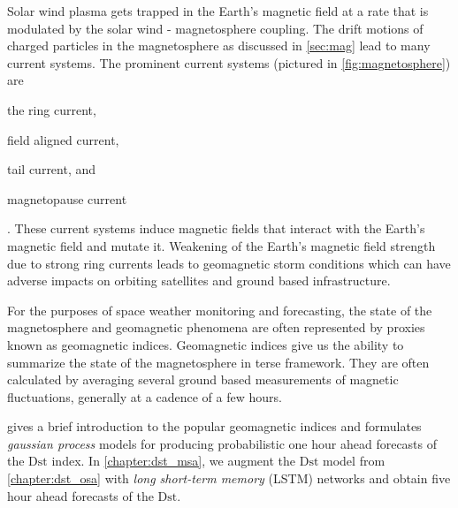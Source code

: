 Solar wind plasma gets trapped in the Earth's magnetic field at a rate that is modulated by the 
solar wind - magnetosphere coupling. The drift motions of charged particles in the magnetosphere as 
discussed in \cref{sec:mag} lead to many current systems. The prominent current systems 
(pictured in \cref{fig:magnetosphere}) are 
%
\begin{enumerate*} 
    \item the ring current,  
    \item field aligned current, 
    \item tail current, and
    \item magnetopause current 
\end{enumerate*}.  
%
These current systems induce magnetic fields that interact with the Earth's magnetic field and 
mutate it. Weakening of the Earth's magnetic field strength due to strong ring currents leads to 
geomagnetic storm conditions which can have adverse impacts on orbiting satellites and ground based 
infrastructure.

For the purposes of space weather monitoring and forecasting, the state of the magnetosphere and 
geomagnetic phenomena are often represented by proxies known as geomagnetic indices. Geomagnetic 
indices give us the ability to summarize the state of the magnetosphere in terse framework. They 
are often calculated by averaging several ground based measurements of magnetic fluctuations, 
generally at a cadence of a few hours.

 gives a brief introduction to the popular geomagnetic indices and formulates 
\emph{gaussian process} models for producing probabilistic one hour ahead forecasts of the 
$\mathrm{Dst}$ index. In \cref{chapter:dst_msa}, we augment the $\mathrm{Dst}$ model from 
\cref{chapter:dst_osa} with \emph{long short-term memory} (LSTM) networks and obtain five hour 
ahead forecasts of the $\mathrm{Dst}$.

\clearpage

%
%
